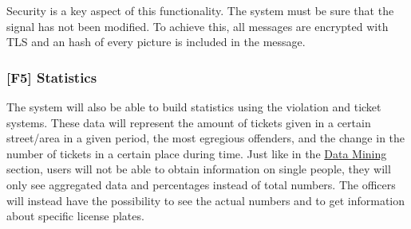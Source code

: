 Security is a key aspect of this functionality. The system must be sure that the signal has not been modified.
To achieve this, all messages are encrypted with TLS and an hash of every picture is included in the message.

\subsubsection[Statistics]{[F5] Statistics\hypertarget{sec:f5}{}}
The system will also be able to build statistics using the violation and ticket systems.
These data will represent the amount of tickets given in a certain street/area in a given period, the most egregious offenders, and the change in the number of tickets in a certain place during time.
Just like in the
\hyperlink{sec:f2}{Data Mining}
section, users will not be able to obtain information on single people, they will only see aggregated data and percentages instead of total numbers.
The officers will instead have the possibility to see the actual numbers and to get information about specific license plates.
\clearpage